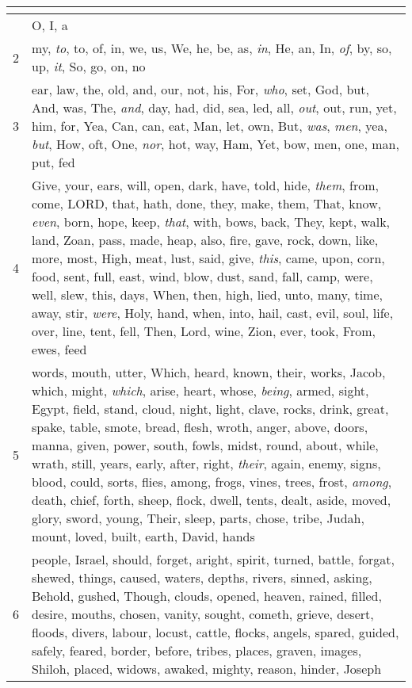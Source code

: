 \begin{center}
\begin{longtable}{l|p{3.75in}}
\hline \multicolumn{2}{c}{{ }} \\ \hline
\endfoot 
1 & O, I, a\\ \hline 
2 & my, \emph{to}, to, of, in, we, us, We, he, be, as, \emph{in}, He, an, In, \emph{of}, by, so, up, \emph{it}, So, go, on, no\\ \hline 
3 & ear, law, the, old, and, our, not, his, For, \emph{who}, set, God, but, And, was, The, \emph{and}, day, had, did, sea, led, all, \emph{out}, out, run, yet, him, for, Yea, Can, can, eat, Man, let, own, But, \emph{was}, \emph{men}, yea, \emph{but}, How, oft, One, \emph{nor}, hot, way, Ham, Yet, bow, men, one, man, put, fed\\ \hline 
4 & Give, your, ears, will, open, dark, have, told, hide, \emph{them}, from, come, LORD, that, hath, done, they, make, them, That, know, \emph{even}, born, hope, keep, \emph{that}, with, bows, back, They, kept, walk, land, Zoan, pass, made, heap, also, fire, gave, rock, down, like, more, most, High, meat, lust, said, give, \emph{this}, came, upon, corn, food, sent, full, east, wind, blow, dust, sand, fall, camp, were, well, slew, this, days, When, then, high, lied, unto, many, time, away, stir, \emph{were}, Holy, hand, when, into, hail, cast, evil, soul, life, over, line, tent, fell, Then, Lord, wine, Zion, ever, took, From, ewes, feed\\ \hline 
5 & words, mouth, utter, Which, heard, known, their, works, Jacob, which, might, \emph{which}, arise, heart, whose, \emph{being}, armed, sight, Egypt, field, stand, cloud, night, light, clave, rocks, drink, great, spake, table, smote, bread, flesh, wroth, anger, above, doors, manna, given, power, south, fowls, midst, round, about, while, wrath, still, years, early, after, right, \emph{their}, again, enemy, signs, blood, could, sorts, flies, among, frogs, vines, trees, frost, \emph{among}, death, chief, forth, sheep, flock, dwell, tents, dealt, aside, moved, glory, sword, young, Their, sleep, parts, chose, tribe, Judah, mount, loved, built, earth, David, hands\\ \hline 
6 & people, Israel, should, forget, aright, spirit, turned, battle, forgat, shewed, things, caused, waters, depths, rivers, sinned, asking, Behold, gushed, Though, clouds, opened, heaven, rained, filled, desire, mouths, chosen, vanity, sought, cometh, grieve, desert, floods, divers, labour, locust, cattle, flocks, angels, spared, guided, safely, feared, border, before, tribes, places, graven, images, Shiloh, placed, widows, awaked, mighty, reason, hinder, Joseph\\ \hline 

\end{longtable}
\end{center}
